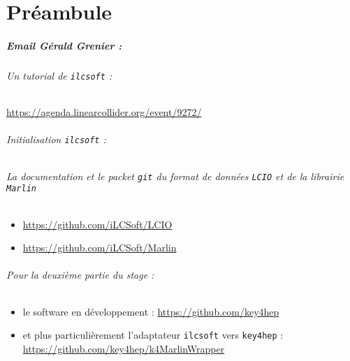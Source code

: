 \chapter*{Préambule}

\paragraph{Email Gérald Grenier :}

\subparagraph{Un tutorial de \texttt{ilcsoft} :} 
\url{https://agenda.linearcollider.org/event/9272/}

\subparagraph{Initialisation \texttt{ilcsoft} :}

\subparagraph{La documentation et le packet \texttt{git} du format de données \texttt{LCIO} et de la librairie \texttt{Marlin}}
\begin{itemize}
	\item \url{https://github.com/iLCSoft/LCIO}
	\item \url{https://github.com/iLCSoft/Marlin}
\end{itemize}


\subparagraph{Pour la deuxième partie du stage :}
\begin{itemize}

	\item le software en développement : 
			\url{https://github.com/key4hep}
			
	\item et plus particulièrement l'adaptateur \texttt{ilcsoft} vers \texttt{key4hep} : 
			\url{https://github.com/key4hep/k4MarlinWrapper}
			
\end{itemize}  